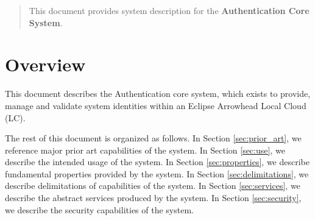 \documentclass[a4paper]{arrowhead}
\begin{document}
\ArrowheadDate{\today}
\ArrowheadSetup

\begin{center}
  \vspace*{1cm}
  \huge{\arrowtitle}

  \vspace*{0.2cm}
  \LARGE{\arrowtype}
  \vspace*{1cm}

  \vspace*{\fill}


  \vspace*{1cm}
  \vspace*{\fill}

  \begin{abstract}
    This document provides system description for the \textbf{Authentication Core System}.
  \end{abstract}

  \vspace*{1cm}

 \end{center}

\newpage

\tableofcontents
\newpage

\section{Overview}
\label{sec:overview}
\color{black}
This document describes the Authentication core system, which exists to provide, manage and validate system identities within an Eclipse Arrowhead Local Cloud (LC).

The rest of this document is organized as follows.
In Section \ref{sec:prior_art}, we reference major prior art capabilities
of the system.
In Section \ref{sec:use}, we describe the intended usage of the system.
In Section \ref{sec:properties}, we describe fundamental properties
provided by the system.
In Section \ref{sec:delimitations}, we describe delimitations of capabilities
of the system.
In Section \ref{sec:services}, we describe the abstract services produced by the system.
In Section \ref{sec:security}, we describe the security capabilities
of the system.
\end{document}
